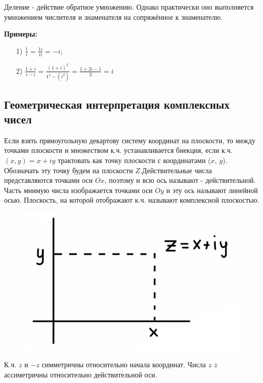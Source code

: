\documentclass[a4paper, 12pt]{report}
\begin{document}
Деление - действие обратное умножению. Однако практически оно выполняется умножением числителя и знаменателя на сопряжённое к знаменателю.
 \par\bigskip
 \textbf{Примеры:} 
 \begin{enumerate}
\item[1)] $\frac{1}{i} = \frac{1i}{ii} = -i$; 
\item[2)] $\frac{1+i}{i-i} = \frac{(1+i)^2}{1^2-(i^2)} = \frac{1+2i-1}{2} = i$
\end{enumerate}




\subsection{Геометрическая интерпретация комплексных чисел}  

Если взять прямоугольную декартову систему координат на плоскости, то между точками плоскости и  множеством к.ч. устанавливается биекция, если к.ч. $(x,y)=x+iy$ трактовать как точку плоскости с координатами ($x$, $y$). Обозначать эту точку будем на плоскости $Z$.Действительные числа представляются точками оси $Ox$, поэтому и всю ось называют - действительной. Часть мнимую числа изображается точками оси $Oy$ и эту ось называют линейной осью. Плоскость, на которой отображают к.ч. называют комплексной плоскостью.     

\begin{figure} 
    \includegraphics[width=0.9\linewidth]{kompl/1kompl.png}
\end{figure}

 К.ч. $z$ и $-z$ симметричны относительно начала координат. Числа $z$ $\overline{z}$ ассиметричны относительно действительной оси.
 
\end{document}
